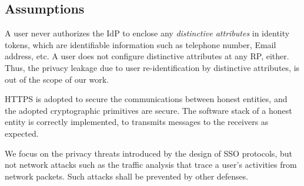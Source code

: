 
\subsection{Assumptions}
A user never authorizes the IdP to enclose any \emph{distinctive attributes} in identity tokens,
        which are identifiable information such as telephone number, Email address, etc.
A user does not configure  distinctive attributes at any RP, either.
Thus, the privacy leakage due to user re-identification by distinctive attributes,
    is out of the scope of our work.

HTTPS is adopted to secure the communications between honest entities,
 and the adopted cryptographic primitives are secure.
The software stack of a honest entity is correctly implemented,
     to transmits messages to the receivers as expected.

We focus on the privacy threats introduced by the design of SSO protocols,
    but not network attacks such as the traffic analysis that trace a user's activities from network packets.
Such attacks shall be prevented by other defenses.






